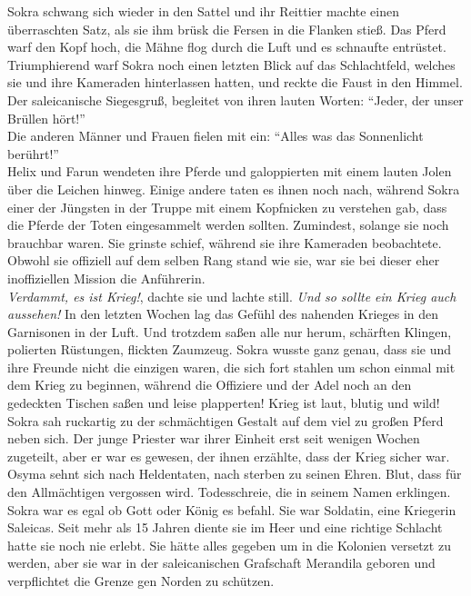 Sokra schwang sich wieder in den Sattel und ihr Reittier machte einen überraschten Satz, als sie 
ihm brüsk die Fersen in die Flanken stieß. Das Pferd warf den Kopf hoch, die Mähne flog durch die 
Luft und es schnaufte entrüstet. Triumphierend warf Sokra noch einen letzten Blick auf das 
Schlachtfeld, welches sie und ihre Kameraden hinterlassen hatten, und reckte die Faust in den 
Himmel. Der saleicanische Siegesgruß, begleitet von ihren lauten Worten: ``Jeder, der unser Brüllen 
hört!''\\
Die anderen Männer und Frauen fielen mit ein: ``Alles was das Sonnenlicht berührt!''\\
Helix und Farun wendeten ihre Pferde und galoppierten mit einem lauten Jolen über die Leichen 
hinweg. Einige andere taten es ihnen noch nach, während Sokra einer der Jüngsten in der Truppe mit 
einem Kopfnicken zu verstehen gab, dass die Pferde der Toten eingesammelt werden sollten. 
Zumindest, solange sie noch brauchbar waren. Sie grinste schief, während sie ihre Kameraden 
beobachtete. Obwohl sie offiziell auf dem selben Rang stand wie sie, war sie bei dieser eher 
inoffiziellen Mission die Anführerin.\\
\textit{Verdammt, es ist Krieg!}, dachte sie und lachte still. \textit{Und so sollte ein Krieg auch 
aussehen!}
In den letzten Wochen lag das Gefühl des nahenden Krieges in den Garnisonen in der Luft. Und 
trotzdem saßen alle nur herum, schärften Klingen, polierten Rüstungen, flickten Zaumzeug. Sokra 
wusste ganz genau, dass sie und ihre Freunde nicht die einzigen waren, die sich fort stahlen um 
schon einmal mit dem Krieg zu beginnen, während die Offiziere und der Adel noch an den gedeckten 
Tischen saßen und leise plapperten! Krieg ist laut, blutig und wild!\\
Sokra sah ruckartig zu der schmächtigen Gestalt auf dem viel zu großen Pferd neben sich. Der junge 
Priester war ihrer Einheit erst seit wenigen Wochen zugeteilt, aber er war es gewesen, der ihnen 
erzählte, dass der Krieg sicher war. Osyma sehnt sich nach Heldentaten, nach sterben zu seinen 
Ehren. Blut, dass für den Allmächtigen vergossen wird. Todesschreie, die in seinem Namen erklingen. 
Sokra war es egal ob Gott oder König es befahl. Sie war Soldatin, eine Kriegerin Saleicas. Seit 
mehr als 15 Jahren diente sie im Heer und eine richtige Schlacht hatte sie noch nie erlebt. Sie 
hätte alles gegeben um in die Kolonien versetzt zu werden, aber sie war in der saleicanischen 
Grafschaft Merandila geboren und verpflichtet die Grenze gen Norden zu schützen.\\
